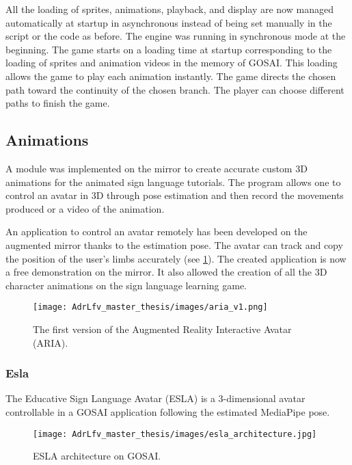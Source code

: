 All the loading of sprites, animations, playback, and display are now managed automatically at startup in asynchronous instead of being set manually in the script or the code as before. The engine was running in synchronous mode at the beginning. The game starts on a loading time at startup corresponding to the loading of sprites and animation videos in the memory of GOSAI. This loading allows the game to play each animation instantly. The game directs the chosen path toward the continuity of the chosen branch. The player can choose different paths to finish the game.

\subsection{Animations}

A module was implemented on the mirror to create accurate custom 3D animations for the animated sign language tutorials. The program allows one to control an avatar in 3D through pose estimation and then record the movements produced or a video of the animation.

An application to control an avatar remotely has been developed on the augmented mirror thanks to the estimation pose. The avatar can track and copy the position of the user's limbs accurately (see \ref{fig:aria_v1}). The created application is now a free demonstration on the mirror. It also allowed the creation of all the 3D character animations on the sign language learning game.

\begin{figure}[h]
    \centering
    \texttt{[image: AdrLfv\_master\_thesis/images/aria\_v1.png]}
    \caption{The first version of the Augmented Reality Interactive Avatar (ARIA).}
    \label{fig:aria_v1}
\end{figure}

\subsubsection{Esla}

The Educative Sign Language Avatar (ESLA) is a 3-dimensional avatar controllable in a GOSAI application following the estimated MediaPipe pose. 

\begin{figure}[h]
    \centering
    \texttt{[image: AdrLfv\_master\_thesis/images/esla\_architecture.jpg]}
    \caption{ESLA architecture on GOSAI.}
    \label{fig:esla_architecture}
\end{figure}

